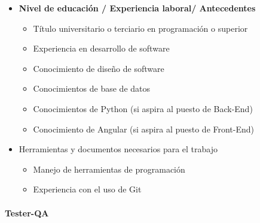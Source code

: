 \begin{itemize}
            \item \textbf{Nivel de educación / Experiencia laboral/ Antecedentes}
                \begin{itemize}
                    \item Título universitario o terciario en programación o superior
                    \item Experiencia en desarrollo de software
                    \item Conocimiento de diseño de software
                    \item Conocimientos de base de datos
                    \item Conocimientos de Python (si aspira al puesto de Back-End)
                    \item Conocimiento de Angular (si aspira al puesto de Front-End)
                \end{itemize}
            \item Herramientas y documentos necesarios para el trabajo
            	\begin{itemize}
                    \item Manejo de herramientas de programación
                    \item Experiencia con el uso de Git
                \end{itemize}          
		\end{itemize}
  
    	\paragraph{Tester-QA}  
    	          	  
